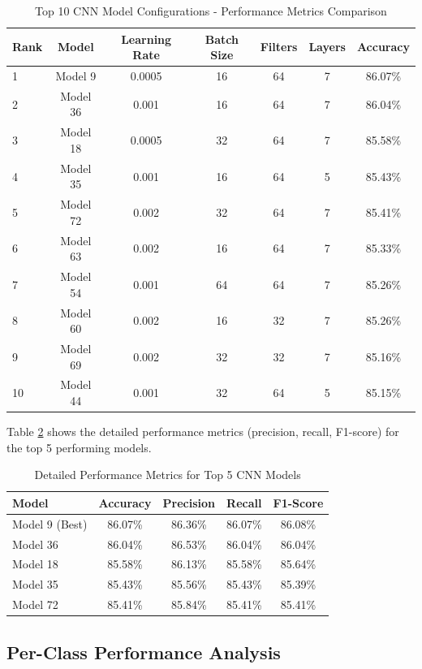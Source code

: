 \documentclass[norunningheads]{llncs}
\begin{document}
\begin{table}[h]
\caption{Top 10 CNN Model Configurations - Performance Metrics Comparison}
\label{tab:performance_metrics}
\centering
\begin{tabular}{@{}lcccccc@{}}
\toprule
Rank & Model & Learning Rate & Batch Size & Filters & Layers & Accuracy \\
\midrule
1 & Model 9 & 0.0005 & 16 & 64 & 7 & 86.07\% \\
2 & Model 36 & 0.001 & 16 & 64 & 7 & 86.04\% \\
3 & Model 18 & 0.0005 & 32 & 64 & 7 & 85.58\% \\
4 & Model 35 & 0.001 & 16 & 64 & 5 & 85.43\% \\
5 & Model 72 & 0.002 & 32 & 64 & 7 & 85.41\% \\
6 & Model 63 & 0.002 & 16 & 64 & 7 & 85.33\% \\
7 & Model 54 & 0.001 & 64 & 64 & 7 & 85.26\% \\
8 & Model 60 & 0.002 & 16 & 32 & 7 & 85.26\% \\
9 & Model 69 & 0.002 & 32 & 32 & 7 & 85.16\% \\
10 & Model 44 & 0.001 & 32 & 64 & 5 & 85.15\% \\
\bottomrule
\end{tabular}
\end{table}

Table \ref{tab:detailed_metrics} shows the detailed performance metrics (precision, recall, F1-score) for the top 5 performing models.

\begin{table}[h]
\caption{Detailed Performance Metrics for Top 5 CNN Models}
\label{tab:detailed_metrics}
\centering
\begin{tabular}{@{}lcccc@{}}
\toprule
Model & Accuracy & Precision & Recall & F1-Score \\
\midrule
Model 9 (Best) & 86.07\% & 86.36\% & 86.07\% & 86.08\% \\
Model 36 & 86.04\% & 86.53\% & 86.04\% & 86.04\% \\
Model 18 & 85.58\% & 86.13\% & 85.58\% & 85.64\% \\
Model 35 & 85.43\% & 85.56\% & 85.43\% & 85.39\% \\
Model 72 & 85.41\% & 85.84\% & 85.41\% & 85.41\% \\
\bottomrule
\end{tabular}
\end{table}

\subsection{Per-Class Performance Analysis}
\end{document}
